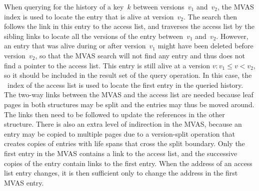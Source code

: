 When querying for the history of a key~$k$ between versions~$v_1$ and~$v_2$,
the MVAS index is used to locate the entry that is alive at version~$v_2$.
The search then follows the link in this entry to the access list, and
traverses the access list by the sibling links to locate all the versions of
the entry between~$v_1$ and~$v_2$.
However, an entry that was alive during or after version~$v_1$ might have been
deleted before version~$v_2$, so that the MVAS search will not find any entry
and thus does not find a pointer to the access list. 
This entry is still alive at a version $v : v_1 \leq v < v_2$, so it should
be included in the result set of the query operation.
In this case, the \Btree\ index of the access list is used to locate the
first entry in the queried history.
The two-way links between the MVAS and the access list are needed because
leaf pages in both structures may be split and the entries may thus be moved
around. 
The links then need to be followed to update the references in the other
structure.
There is also an extra level of indirection in the MVAS, because an entry may
be copied to multiple pages due to a version-split operation that creates
copies of entries with life spans that cross the split boundary.
Only the first entry in the MVAS contains a link to the access list, and the
successive copies of the entry contain links to the first entry.
When the address of an access list entry changes, it is then sufficient only
to change the address in the first MVAS entry.

